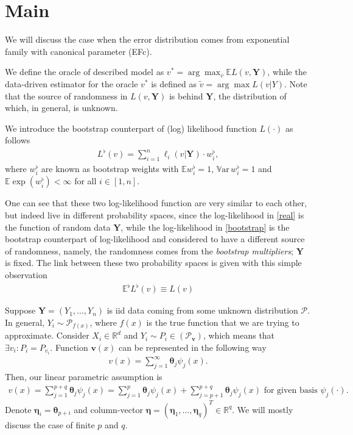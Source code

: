 \documentclass[12pt]{article}
\renewcommand{\v}[1]{\ensuremath{\mathbf{#1}}} %
\renewcommand{\=}[1]{\stackrel{#1}{=}} %
\begin{document}
\section{Main}
We will discuss the case when the error distribution comes from exponential family with canonical parameter (EFc). 
\par We define the oracle of described model as $v^* = \arg\max_{v} \mathbb{E} L(v, \mathbf{Y})$, while the data-driven estimator for the oracle $v^*$ is defined as $\tilde{v} = \arg\max L (v | Y)$. Note that the source of randomness in $L(v, \mathbf{Y})$ is behind $\mathbf{Y}$, the distribution of which, in general, is unknown. 
\par We introduce the bootstrap counterpart of (log) likelihood function $L(\cdot)$ as follows 
\begin{align}\label{bootstrap}
L^{\flat}(v) = \sum_{i=1}^n \ell_i(v | \mathbf{Y}) \cdot w_i^{\flat}, 
\end{align}
where $w_i^{\flat}$ are known as bootstrap weights with $\mathbb{E} w_i^{\flat} = 1$,  $\mathbb{V}\text{ar} \, w_i^{\flat} = 1$ and $\mathbb{E} \exp(w_i^{\flat}) < \infty$ for all $i \in [1, n]$. \par One can see that these two log-likelihood function are very similar to each other, but indeed live in different probability spaces, since the log-likelihood in \eqref{real} is the function of random data $\mathbf{Y}$, while the log-likelihood in \eqref{bootstrap} is the bootstrap counterpart of log-likelihood and considered to have a different source of randomness, namely, the randomness comes from the {\it{bootstrap multipliers}}; $\mathbf{Y}$ is fixed. The link between these two probability spaces is given with this simple observation 
\begin{align}
\mathbb{E}^{\flat} L^{\flat}(v) \equiv L(v)
\end{align}
\par Suppose $\mathbf{Y} = (Y_1, \dots, Y_n)$ is iid data coming from some unknown distribution $\mathcal{P}$. In general, $Y_i \sim \mathcal{P}_{f(x)}$, where $f(x)$ is the true function that we are trying to approximate. Consider $X_i \in \mathbb{R}^d$ and $Y_i \sim P_i \in (\mathcal{P}_{\v{v}})$, which means that $\exists v_i : P_i = P_{v_i}$. Function $\v{v}(x)$ can be represented in the following way
\begin{eqnarray*}
v(x) = \sum_{j=1}^{\infty} {\v{\theta}}_j \psi_j(x).
\end{eqnarray*}
Then, our linear parametric assumption is
\begin{eqnarray}
v(x) = \sum_{j=1}^{p+q} {\v{\theta}}_j \psi_j(x) = \sum_{j=1}^p {\v{\theta}}_j \psi_{j}(x) + \sum_{j= p+1}^{p+q} {\v{\theta}}_j \psi_{j}(x) \text{ for given basis $\psi_j(\cdot)$}.
\end{eqnarray}
Denote ${\v{\eta}}_{i} = {\v{\theta}}_{p + i}$ and column-vector ${\v{\eta}} = ({\v{\eta}}_1, \dots, {\v{\eta}}_{q})^T \in \mathbb{R}^q$.
We will mostly discuss the case of finite $p$ and $q$.
\end{document}
